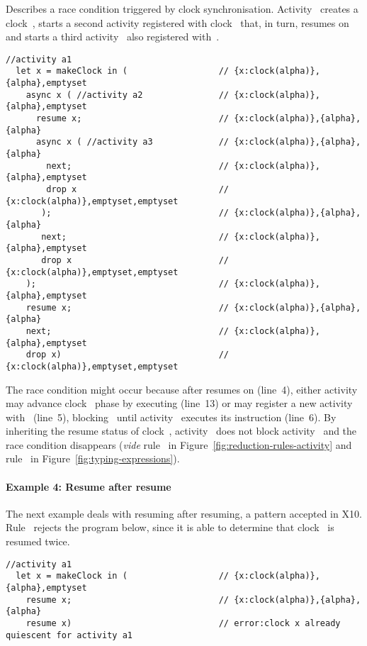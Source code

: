 Describes a race condition triggered by clock synchronisation.
Activity~ creates a clock~, starts a second activity 
registered with clock~ that, in turn, resumes on~ and starts a
third activity~ also registered with~.
\begin{lstlisting}[numbers=right]
  //activity a1
  let x = makeClock in (                  // {x:clock(alpha)},{alpha},emptyset 
    async x ( //activity a2               // {x:clock(alpha)},{alpha},emptyset
      resume x;                           // {x:clock(alpha)},{alpha},{alpha}
      async x ( //activity a3             // {x:clock(alpha)},{alpha},{alpha}
        next;                             // {x:clock(alpha)},{alpha},emptyset
        drop x                            // {x:clock(alpha)},emptyset,emptyset
       );                                 // {x:clock(alpha)},{alpha},{alpha}
       next;                              // {x:clock(alpha)},{alpha},emptyset
       drop x                             // {x:clock(alpha)},emptyset,emptyset
    );                                    // {x:clock(alpha)},{alpha},emptyset
    resume x;                             // {x:clock(alpha)},{alpha},{alpha}
    next;                                 // {x:clock(alpha)},{alpha},emptyset
    drop x)                               // {x:clock(alpha)},emptyset,emptyset
\end{lstlisting}
The race condition might occur because after  resumes on 
(line~4), either activity~ may advance clock~ phase by executing
 (line~13) or  may register a new activity~
with~ (line~5), blocking~ until activity~ executes
its  instruction (line~6).
By inheriting the resume status of clock~, activity~ does not
block activity~ and the race condition disappears (\textit{vide}
rule~\Rasync{} in Figure~\ref{fig:reduction-rules-activity} and
rule~\Tasync{} in Figure~\ref{fig:typing-expressions}). 

\paragraph{Example 4: Resume after resume}

The next example deals with resuming after resuming, a pattern
accepted in X10. Rule~ rejects the program below, since it
is able to determine that clock~ is resumed twice.
\begin{lstlisting}[numbers=right]
  //activity a1
  let x = makeClock in (                  // {x:clock(alpha)},{alpha},emptyset
    resume x;                             // {x:clock(alpha)},{alpha},{alpha}
    resume x)                             // error:clock x already quiescent for activity a1
\end{lstlisting} 


